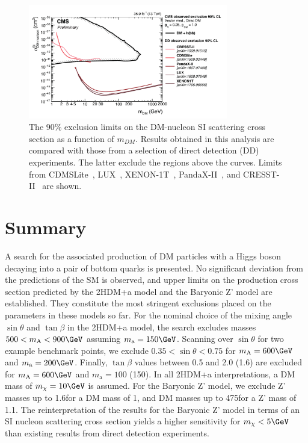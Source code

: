 \begin{figure}
  \centering
  \includegraphics[width=0.775\textwidth]{figures/limits/SpinIndepend_XsecDM_MonoHbb_bb_obs_Summary_prelim.pdf}
  \caption{The 90\% \CL exclusion limits on the DM-nucleon SI scattering cross section as a function of $m_{DM}$. 
Results obtained in this analysis are compared with those from a selection of direct detection (DD) experiments. 
The latter exclude the regions above the curves. 
Limits from CDMSLite~\cite{CDMSLite}, LUX~\cite{LUX}, XENON-1T~\cite{XENON1T}, PandaX-II~\cite{PandaxII}, and CRESST-II~\cite{CresstII} are shown.}
  \label{fig:limitsdd}
\end{figure}


\section{Summary}

A search for the associated production of DM particles with a Higgs
boson decaying into a pair of bottom quarks is presented. No significant
deviation from the predictions of the SM is observed, and upper limits on
the production cross section predicted by the 2HDM+a model and the
Baryonic Z' model are established. They constitute the  most stringent  exclusions placed on the parameters in these
models so far. For the nominal choice of the mixing angle $\sin\theta$
and $\tan\beta$ in the 2HDM+a model, the search excludes masses
$500<m_\text{A}<900\GeV$ assuming $m_\text{a}=150\GeV$. Scanning over
$\sin\theta$ for two example benchmark points, we exclude
$0.35<\sin\theta<0.75$ for $m_\text{A}=600\GeV$ and
$m_\text{a}=200\GeV$.  Finally, $\tan\beta$ values between 0.5 and 2.0
(1.6) are excluded for $m_\text{A}=600\GeV$ and $m_\text{a}=100$
(150)\GeV. In all 2HDM+a interpretations, a DM mass of $m_\chi=10\GeV$ is assumed. For the Baryonic Z' model, we exclude Z' masses up to 1.6\TeV for a DM mass of 1\GeV, and DM masses up to 475\GeV for a Z' mass of 1.1\TeV. The reinterpretation of the results for the Baryonic Z' model in terms of an SI nucleon scattering cross section yields a higher sensitivity for $m_\chi<5\GeV$ than existing results from direct detection experiments. 

 
